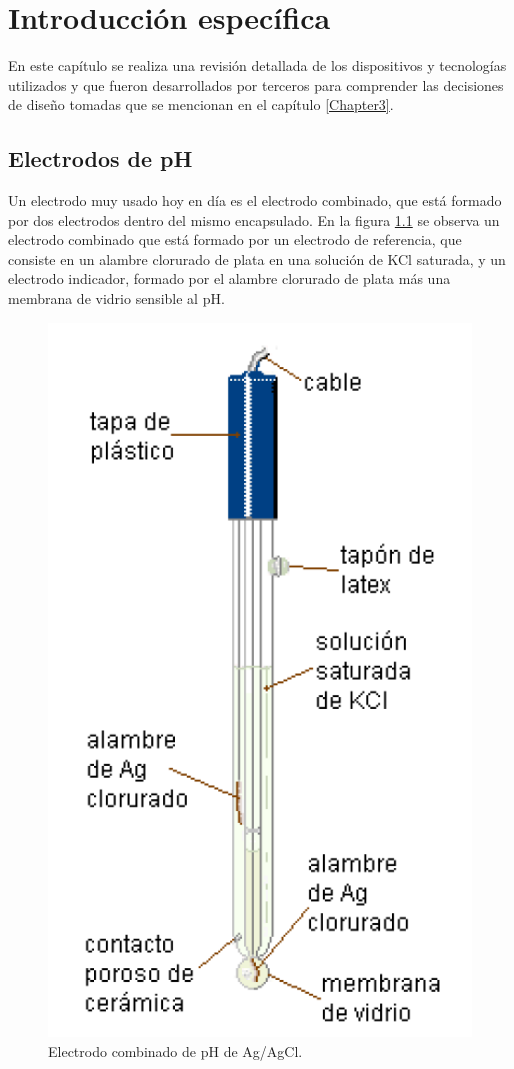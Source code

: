 \chapter{Introducción específica} %

\label{Chapter2}

En este capítulo se  realiza una revisión detallada de los dispositivos y tecnologías utilizados y que fueron desarrollados por terceros para comprender las decisiones de diseño tomadas que se mencionan en el capítulo \ref{Chapter3}. 

\section{Electrodos de pH}
\label{sec:electrodoPH}

Un electrodo muy usado hoy en día es el electrodo combinado, que está formado por dos electrodos dentro del mismo encapsulado. En la figura \ref{fig:electrodoCombinado} se observa un electrodo combinado que está formado por un electrodo de referencia, que consiste en un alambre clorurado de plata en una solución de KCl saturada, y un electrodo indicador, formado por el alambre clorurado de plata más una membrana de vidrio sensible al pH.

\begin{figure}[htbp]
	\centering
	\includegraphics[width=.4\textwidth]{./Figures/electrodoCombinado.png}
	\caption{Electrodo combinado de pH de Ag/AgCl\protect\footnotemark.}
	\label{fig:electrodoCombinado}
\end{figure}

